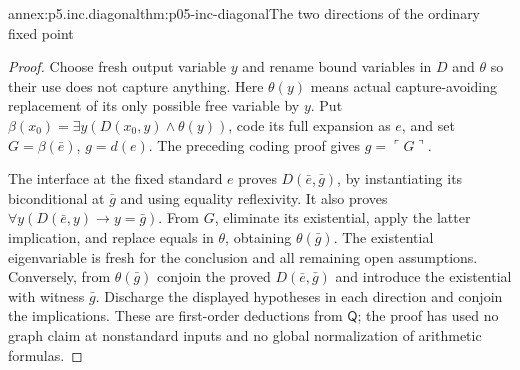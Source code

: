 \begin{annexitem}{annex:p5.inc.diagonal}{thm:p05-inc-diagonal}{The two directions of the ordinary fixed point}
\begin{proof}
Choose fresh output variable \(y\) and rename bound variables in
\(D\) and \(\theta\) so their use does not capture anything. Here
\(\theta(y)\) means actual capture-avoiding replacement of its only
possible free variable by \(y\). Put
\(\beta(x_0)=\exists y(D(x_0,y)\land\theta(y))\), code its full
expansion as \(e\), and set \(G=\beta(\bar e)\), \(g=d(e)\).
The preceding coding proof gives \(g=\ulcorner G\urcorner\).

The interface at the fixed standard \(e\) proves
\(D(\bar e,\bar g)\), by instantiating its biconditional at
\(\bar g\) and using equality reflexivity. It also proves
\(\forall y(D(\bar e,y)\to y=\bar g)\).
From \(G\), eliminate its existential, apply the latter implication,
and replace equals in \(\theta\), obtaining \(\theta(\bar g)\).
The existential eigenvariable is fresh for the conclusion and all
remaining open assumptions. Conversely, from \(\theta(\bar g)\)
conjoin the proved \(D(\bar e,\bar g)\) and introduce the existential
with witness \(\bar g\). Discharge the displayed hypotheses in each
direction and conjoin the implications. These are first-order deductions
from \(\mathsf Q\); the proof has used no graph claim at nonstandard
inputs and no global normalization of arithmetic formulas.
\end{proof}
\end{annexitem}


